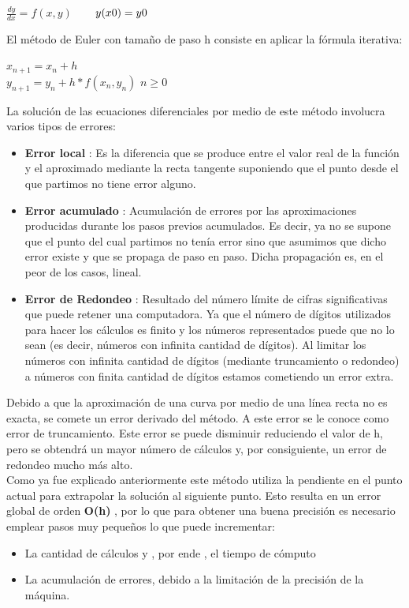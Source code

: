 \documentclass[12pt,a4paper]{article}
\begin{document}
        \begin{center}
              $\frac{dy}{dx} = f(x,y)$
            $\hspace*{0.6cm}y(x0) = y0$ 
        \end{center}   
    \vspace{0.5cm}
    El método de Euler con tamaño de paso h consiste en aplicar la fórmula iterativa:
        \begin{center}
             $x_{n+1} = x_n + h$\\
             \vspace*{0.5cm} 
            $y_{n+1} = y_n + h * f(x_n,y_n)$
            \hspace*{0.6cm}$ n\geq 0$\\  
        \end{center}
    \vspace*{1cm}
    La solución de las ecuaciones diferenciales por medio de este método involucra varios tipos de errores:
    \begin{itemize}
        \item \textbf{Error local} : Es la diferencia que se produce entre el valor real de la función y el aproximado mediante la recta tangente suponiendo que el punto desde el que partimos no tiene error alguno.
        \item \textbf{Error acumulado} : Acumulación de errores por las aproximaciones producidas durante los pasos previos acumulados. Es decir, ya no se supone que el punto del cual partimos no tenía error sino que asumimos que dicho error existe y que se propaga de paso en paso. Dicha propagación es, en el peor de los casos, lineal.
        \item \textbf{Error de Redondeo} : Resultado del número límite de cifras significativas que puede retener una computadora. Ya que el número de dígitos utilizados para hacer los cálculos es finito y los números representados puede que no lo sean (es decir, números con infinita cantidad de dígitos). Al limitar los números con infinita cantidad de dígitos (mediante truncamiento o redondeo) a números con finita cantidad de dígitos estamos cometiendo un error extra.
    \end{itemize} 
    Debido a que la aproximación de una curva por medio de una línea recta no es exacta, se comete un error derivado del método. A este error se le conoce como error de truncamiento. Este error se puede disminuir reduciendo el valor de h, pero se obtendrá un mayor número de cálculos y, por consiguiente, un error de redondeo mucho más alto.\\
    Como ya fue explicado anteriormente este método utiliza la pendiente en el punto actual para extrapolar la solución al siguiente punto.
     Esto resulta en un error global de orden \textbf{O(h)} , por lo que para obtener una 
     buena precisión es necesario emplear pasos muy pequeños lo que puede incrementar:
     \begin{itemize}
        \item La cantidad de cálculos y , por ende , el tiempo de cómputo
        \item La acumulación de errores, debido a la limitación de la precisión de la máquina.
     \end{itemize}
\end{document}
